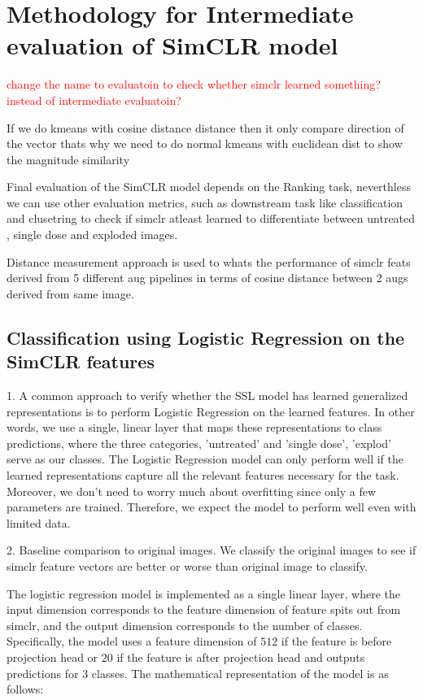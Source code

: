 \chapter{Methodology for Intermediate evaluation of SimCLR model}\label{ch:Methodology for Intermediate evaluation of SimCLR model}

\textcolor{red}{change the name to evaluatoin to check whether simclr learned something? instead of intermediate evaluatoin?}  

If we do kmeans with cosine distance distance then it only compare direction of the vector thats why we need to do normal kmeans with euclidean dist to show 
the magnitude similarity

Final evaluation of the SimCLR model depends on the  Ranking task, neverthless we can use other evaluation metrics, such as downstream task 
like classification  and clusetring to check if simclr atleast learned to differentiate between untreated , single dose and exploded images.

Distance measurement approach is used to whats the performance of simclr feats derived from  5 different aug pipelines  in terms of cosine distance between 2 augs derived 
from same image.

\section{Classification using Logistic Regression on the SimCLR features}
1. A common approach to verify whether the SSL model has learned generalized representations is to perform Logistic Regression on the learned features.
 In other words, we use a single, linear layer that maps these representations to class predictions, where the three categories, 'untreated' and 'single dose', 'explod'  
 serve as our classes. The Logistic Regression model can only perform well if the learned representations capture all the relevant features necessary for the task. 
 Moreover, we don't need to worry much about overfitting since only a few parameters are trained. Therefore, we expect the model to perform well even with limited data.
 

2. Baseline comparison to original images. We classify the original images to see if simclr feature vectors are better or worse than original image to classify.

The logistic regression model is implemented as a single linear layer, where the input dimension corresponds to the feature dimension of feature spits out from simclr, and the 
output dimension corresponds to the number of classes. Specifically, the model uses a feature dimension of \(512\) if the feature is before projection head or  \(20\) if the
 feature is after projection head and outputs predictions for \(3\) classes. The mathematical representation of the model is as follows:

